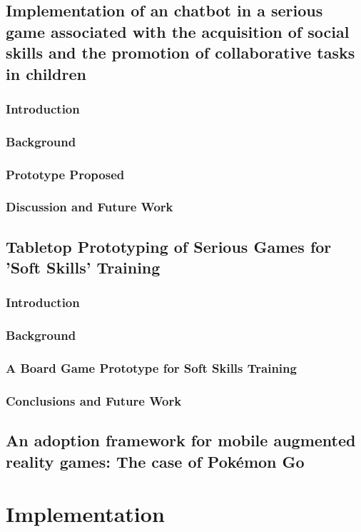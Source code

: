 \documentclass[runningheads]{llncs}
\begin{document}
\subsection{Implementation of an chatbot in a serious game associated with the acquisition of social skills and the promotion of collaborative tasks in children}

\subsubsection{Introduction}
\subsubsection{Background}
\subsubsection{Prototype Proposed}
\subsubsection{Discussion and Future Work}


\subsection{Tabletop Prototyping of Serious Games for 'Soft Skills' Training}

\subsubsection{Introduction}
\subsubsection{Background}
\subsubsection{A Board Game Prototype for Soft Skills Training}
\subsubsection{Conclusions and Future Work}

\subsection{An adoption framework for mobile augmented reality games: The case of Pokémon Go}

\section{Implementation}
\end{document}
